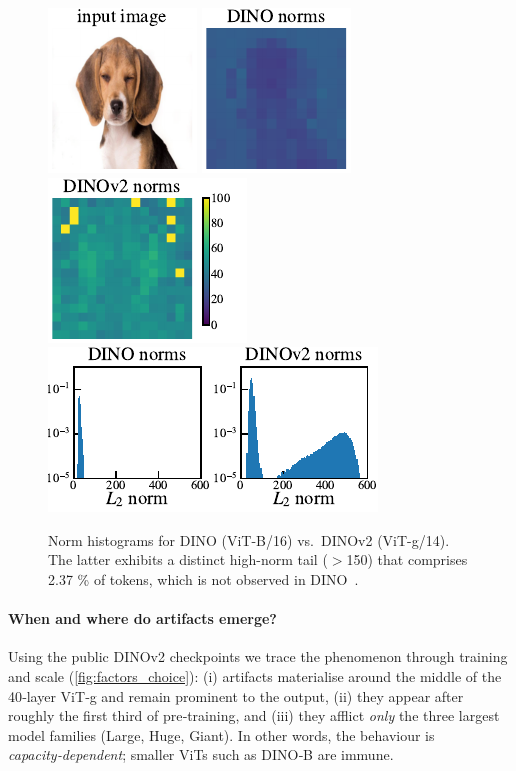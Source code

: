 \documentclass{article}
\newcommand{\citep}{\parencite}
\begin{document}
\begin{figure}[t]
  \includegraphics{resources/figure_3_1.pdf}
  \includegraphics{resources/figure_3_2.pdf}
  \includegraphics{resources/figure_3_3.pdf}
  \includegraphics{resources/figure_3_4.pdf}
  \caption{
    Norm histograms for DINO (ViT-B/16) vs.\ DINOv2 (ViT-g/14). 
    The latter exhibits a distinct high-norm tail ($>$150) that comprises 2.37 \% of tokens, which is not observed in DINO~\citep{darcetVisionTransformersNeed2024}.}
  \label{fig:norms_hist}
\end{figure}

\paragraph{When and where do artifacts emerge?}
Using the public DINOv2 checkpoints we trace the phenomenon through training and scale (\cref{fig:factors_choice}):
(i) artifacts materialise around the middle of the 40‑layer ViT‑g and remain prominent to the output,
(ii) they appear after roughly the first third of pre‑training, and
(iii) they afflict \emph{only} the three largest model families (Large, Huge, Giant).
In other words, the behaviour is \emph{capacity‑dependent}; smaller ViTs such as DINO‑B are immune.
\end{document}
